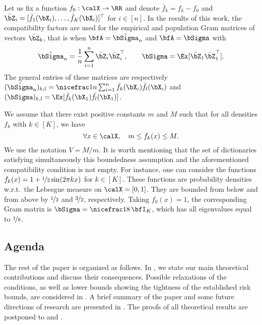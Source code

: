 Let us fix a function $f_0:\calX\to\RR$ and denote 
$\bar f_k = f_k-f_0$ and $\bar \bZ_i = [\bar f_1(\bX_i),\ldots,\bar f_K(\bX_i)]^\top$ 
for $i\in[n]$. In the results of this work, the compatibility factors are used for the empirical 
and population Gram matrices of vectors $\bar\bZ_k$, that is when $\bfA = \hat\bSigma_n$ and 
$\bfA = \bSigma$ with
\begin{equation}
\label{Gram}
\hat\bSigma_n = \frac1n \sum_{i=1}^n \bar\bZ_i\bar\bZ_i^\top,\qquad 
\bSigma = \Ex[\bar\bZ_1\bar\bZ_1^\top].
\end{equation}
The general entries of these matrices are respectively $(\hat\bSigma_n)_{k,l} =
\nicefrac1n\sum_{i=1}^n \bar f_k(\bX_i)\bar f_l(\bX_i)$ and $(\bSigma)_{k,l} = 
\Ex[\bar f_k(\bX_1)\bar f_l(\bX_1)]$. 

We assume that there exist positive constants $m$ and $M$ such that for all densities 
$f_k$ with $k \in [K]$, we have
\begin{equation}
\label{densConst}
  \forall x \in \calX, \quad m\le f_k(x) \le M.
\end{equation}
We use the notation $V = M/m$. It is worth mentioning that the set of dictionaries
satisfying simultaneously this boundedness assumption and the aforementioned compatibility 
condition is not empty. For instance, one can consider the functions 
$f_k(x) = 1+\nicefrac12\sin(2\pi k x)$ for $k\in [K]$. These functions are probability 
densities w.r.t.\ the Lebesgue measure on $\calX = [0,1]$. They are bounded from below 
and from  above by $\nicefrac12$ and $\nicefrac32$, respectively. Taking $f_0(x) = 1$, 
the corresponding Gram matrix is $\bSigma = \nicefrac18\,\bfI_K$, which has all eigenvalues
equal to $\nicefrac18$.

\subsection{Agenda}

The rest of the paper is organized as follows. In , we state our
main theoretical contributions and discuss their consequences. Possible relaxations of
the conditions, as well as lower bounds showing the tightness of the established risk
bounds, are considered in .
A brief summary of the paper and some future directions of research are presented
in . The proofs of all theoretical results are postponed
to  and .

